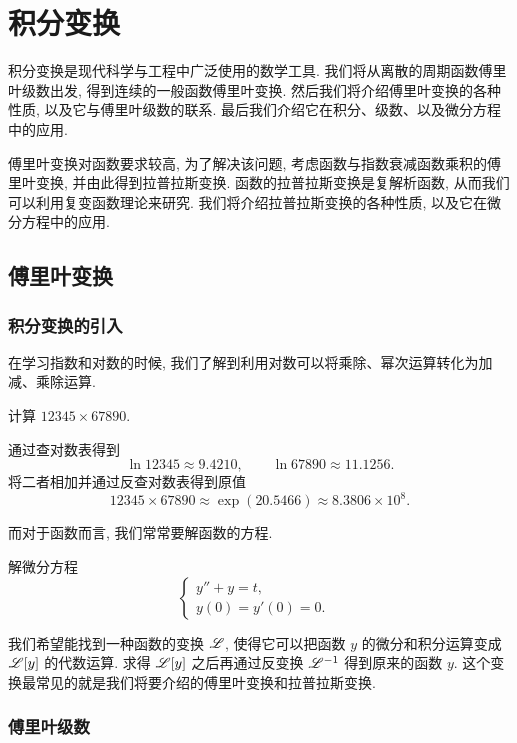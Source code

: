 \chapter{积分变换}
\label{chapter:7}

积分变换是现代科学与工程中广泛使用的数学工具.
我们将从离散的周期函数傅里叶级数出发, 得到连续的一般函数傅里叶变换.
然后我们将介绍傅里叶变换的各种性质, 以及它与傅里叶级数的联系.
最后我们介绍它在积分、级数、以及微分方程中的应用.

傅里叶变换对函数要求较高, 为了解决该问题, 考虑函数与指数衰减函数乘积的傅里叶变换, 并由此得到拉普拉斯变换.
函数的拉普拉斯变换是复解析函数, 从而我们可以利用复变函数理论来研究.
我们将介绍拉普拉斯变换的各种性质, 以及它在微分方程中的应用.

\section{傅里叶变换}

\subsection{积分变换的引入}

在学习指数和对数的时候, 我们了解到利用对数可以将乘除、幂次运算转化为加减、乘除运算.
\begin{example}
  计算 $12345\times 67890$.
\end{example}

\begin{solution}
  通过查对数表得到
  \[
    \ln 12345\approx 9.4210,\qquad\ln 67890\approx 11.1256.
  \]
  将二者相加并通过反查对数表得到原值
  \[
    12345\times 67890\approx \exp(20.5466)\approx 8.3806\times 10^8.
  \]
\end{solution}

而对于函数而言, 我们常常要解函数的方程.

\begin{example}
  解微分方程
  \[
    \begin{cases}
      y''+y=t,&\\
      y(0)=y'(0)=0.&
    \end{cases}
  \]
\end{example}

我们希望能找到一种函数的\alert{变换 $\mathscr{L}$}, 使得它可以把函数 $y$ 的微分和积分运算变成 $\mathscr{L}[y]$ 的代数运算.
求得 $\mathscr{L}[y]$ 之后再通过\alert{反变换 $\mathscr{L}^{-1}$} 得到原来的函数 $y$.
这个变换最常见的就是我们将要介绍的傅里叶变换和拉普拉斯变换.


\subsection{傅里叶级数}

